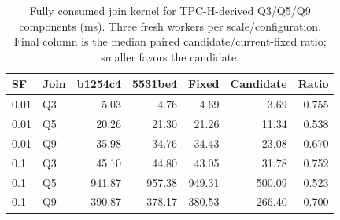 \begin{table}[ht]
\caption{Fully consumed join kernel for TPC-H-derived Q3/Q5/Q9 components (ms). Three fresh workers per scale/configuration. Final column is the median paired candidate/current-fixed ratio; smaller favors the candidate.}
\label{tab:tpch-joins}
\centering\small
\begin{tabular}{@{}llrrrrr@{}}
\toprule
SF & Join & b1254c4 & 5531be4 & Fixed & Candidate & Ratio \\
\midrule
0.01 & Q3 & 5.03 & 4.76 & 4.69 & 3.69 & 0.755 \\
0.01 & Q5 & 20.26 & 21.30 & 21.26 & 11.34 & 0.538 \\
0.01 & Q9 & 35.98 & 34.76 & 34.43 & 23.08 & 0.670 \\
0.1 & Q3 & 45.10 & 44.80 & 43.05 & 31.78 & 0.752 \\
0.1 & Q5 & 941.87 & 957.38 & 949.31 & 500.09 & 0.523 \\
0.1 & Q9 & 390.87 & 378.17 & 380.53 & 266.40 & 0.700 \\
\bottomrule
\end{tabular}
\end{table}
